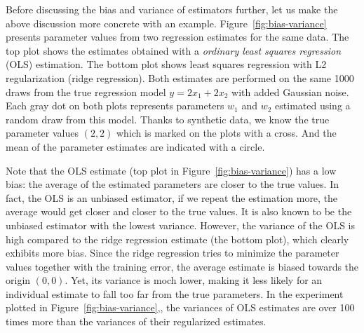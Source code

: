 \begin{marginfigure}
  \caption{\label{fig:bias-variance}%
    A demonstration of bias and variance through a regression problem
    with two predictors.
    Each dot in the plots indicates an estimate of 
    the coefficients of a regression equation sampled
    using three $(\vect{x}, y)$ pairs 
    from the equation $y = 2 x_{1} + 2 x_{2}$ with added Gaussian noise.
    The values on the top plot are estimated
    using ordinary least-squares regression,
    while the bottom plot includes an L2 regularization term with 
    regularization parameter \num{10}.
    The true values of parameters $(2, 2)$ is indicated
    by a cross on the plots.
    The circles indicate average of the estimates.
  }
\end{marginfigure}
Before discussing the bias and variance of estimators further,
let us make the above discussion more concrete with an example.
Figure~\ref{fig:bias-variance} presents parameter values
from two regression estimates for the same data.
The top plot shows the estimates obtained with 
a \emph{ordinary least squares regression} (OLS) estimation.
The bottom plot shows least squares regression
with L2 regularization (ridge regression).
Both estimates are performed on the same \num{1000} 
draws from the true regression model $y = 2 x_{1} + 2 x_{2}$
with added Gaussian noise.
Each gray dot on both plots represents parameters $w_{1}$ and $w_{2}$
estimated using a random draw from this model.
Thanks to synthetic data,
we know the true parameter values $(2, 2)$
which is marked on the plots with a cross.
And the mean of the parameter estimates are indicated with a circle.

Note that the OLS estimate (top plot in Figure~\ref{fig:bias-variance})
has a low bias:
the average of the estimated parameters are closer to the true values.
In fact, the OLS is an unbiased estimator,
if we repeat the estimation more,
the average would get closer and closer to the true values.
It is also known to be the unbiased estimator with the lowest variance.
However, the variance of the OLS is high
compared to the ridge regression estimate (the bottom plot),
which clearly exhibits more bias.
Since the ridge regression tries to minimize the parameter values
together with the training error,
the average estimate is biased towards the origin $(0, 0)$.
Yet, its variance is moch lower,
making it less likely for an individual estimate to fall
too far from the true parameters.
In the experiment plotted in Figure~\ref{fig:bias-variance},,
the variances of OLS estimates are over \num{100} times more than
the variances of their regularized estimates.

